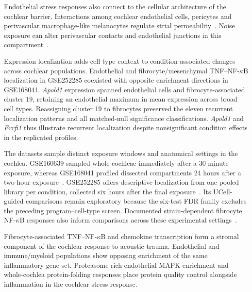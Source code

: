 Endothelial stress responses also connect to the cellular architecture of the cochlear barrier. Interactions among cochlear endothelial cells, pericytes and perivascular macrophage-like melanocytes regulate strial permeability~\citep{Neng2013}. Noise exposure can alter perivascular contacts and endothelial junctions in this compartment~\citep{Zhang2013}.

Expression localization adds cell-type context to condition-associated changes across cochlear populations. Endothelial and fibrocyte/\allowbreak{}mesenchymal TNF--NF-\(\kappa\)B localization in GSE252285 coexisted with opposite enrichment directions in GSE168041. \mbox{\textit{Apold1}} expression spanned endothelial cells and fibrocyte-associated cluster 19, retaining an endothelial maximum in mean expression across broad cell types. Reassigning cluster 19 to fibrocytes preserved the eleven recurrent localization patterns and all matched-null significance classifications. \mbox{\textit{Apold1}} and \mbox{\textit{Errfi1}} thus illustrate recurrent localization despite nonsignificant condition effects in the replicated profiles.

The datasets sample distinct exposure windows and anatomical settings in the cochlea. GSE160639 sampled whole cochleae immediately after a 30-minute exposure, whereas GSE168041 profiled dissected compartments 24 hours after a two-hour exposure~\citep{Jongkamonwiwat2020,Milon2021}. GSE252285 offers descriptive localization from one pooled library per condition, collected six hours after the final exposure~\citep{GSE252285}. Its UCell-guided comparisons remain exploratory because the six-test FDR family excludes the preceding program--cell-type screen. Documented strain-dependent fibrocyte NF-\(\kappa\)B responses also inform comparisons across these experimental settings~\citep{Herranen2018}.

Fibrocyte-associated TNF--NF-\(\kappa\)B and chemokine transcription form a stromal component of the cochlear response to acoustic trauma. Endothelial and immune/\allowbreak{}myeloid populations show opposing enrichment of the same inflammatory gene set. Proteasome-rich endothelial MAPK enrichment and whole-cochlea protein-folding responses place protein quality control alongside inflammation in the cochlear stress response.
